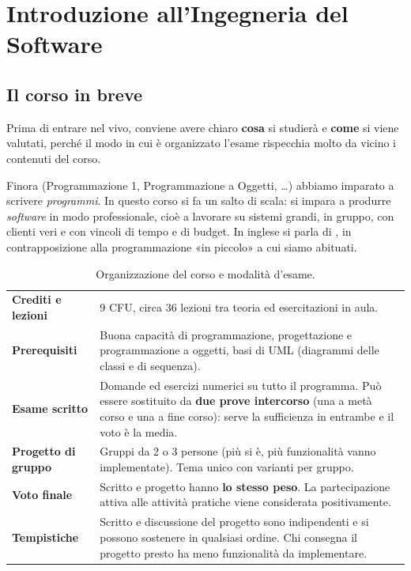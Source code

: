 \chapter{Introduzione all'Ingegneria del Software}

\section{Il corso in breve}

Prima di entrare nel vivo, conviene avere chiaro \textbf{cosa} si studierà e \textbf{come} si viene valutati,
perché il modo in cui è organizzato l'esame rispecchia molto da vicino i contenuti del corso.

Finora (Programmazione 1, Programmazione a Oggetti, \ldots) abbiamo imparato a scrivere \textit{programmi}.
In questo corso si fa un salto di scala: si impara a produrre \textit{software} in modo professionale,
cioè a lavorare su sistemi grandi, in gruppo, con clienti veri e con vincoli di tempo e di budget.
In inglese si parla di , in contrapposizione alla programmazione «in piccolo»
a cui siamo abituati.

\begin{table}[H]
\centering
\renewcommand{\arraystretch}{1.45}
\begin{tabularx}{0.92\textwidth}{>{\bfseries\leavevmode\color{primary!80!black}}P{3.6cm} L}
\toprule
Crediti e lezioni & 9 CFU, circa 36 lezioni tra teoria ed esercitazioni in aula. \\
Prerequisiti & Buona capacità di programmazione, progettazione e programmazione a oggetti, basi di UML (diagrammi delle classi e di sequenza). \\
Esame scritto & Domande ed esercizi numerici su tutto il programma. Può essere sostituito da \textbf{due prove intercorso} (una a metà corso e una a fine corso): serve la sufficienza in entrambe e il voto è la media. \\
Progetto di gruppo & Gruppi da 2 o 3 persone (più si è, più funzionalità vanno implementate). Tema unico con varianti per gruppo. \\
Voto finale & Scritto e progetto hanno \textbf{lo stesso peso}. La partecipazione attiva alle attività pratiche viene considerata positivamente. \\
Tempistiche & Scritto e discussione del progetto sono indipendenti e si possono sostenere in qualsiasi ordine. Chi consegna il progetto presto ha meno funzionalità da implementare. \\
\bottomrule
\end{tabularx}
\caption{Organizzazione del corso e modalità d'esame.}
\end{table}


